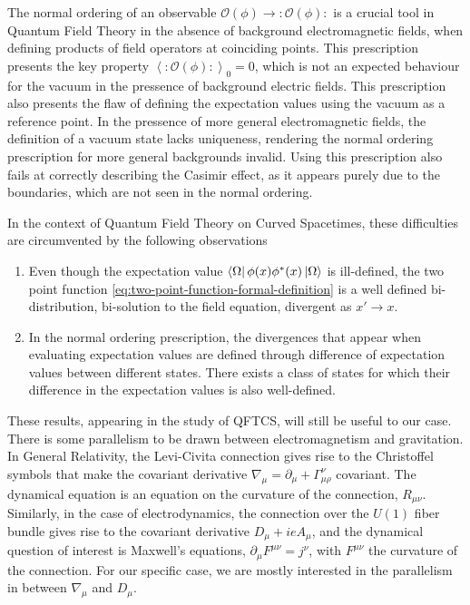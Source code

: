 The normal ordering of an observable $\mathcal{O}(\phi) \rightarrow :\mathcal{O}(\phi):$ is a crucial tool in Quantum Field Theory in the absence of background electromagnetic fields, when defining products of field operators at coinciding points. This prescription presents the key property $ \left< :\mathcal{O}(\phi): \right>_0 = 0$, which is not an expected behaviour for the vacuum in the pressence of background electric fields. This prescription also presents the flaw of defining the expectation values using the vacuum as a reference point. In the pressence of more general electromagnetic fields, the definition of a vacuum state lacks uniqueness, rendering the normal ordering prescription for more general backgrounds invalid. Using this prescription also fails at correctly describing the Casimir effect, as it appears purely due to the boundaries, which are not seen in the normal ordering.

In the context of Quantum Field Theory on Curved Spacetimes, these difficulties are circumvented by the following observations
\begin{enumerate}
	\item Even though the expectation value $ \bra{\Omega} \phi(x)\phi^*(x) \ket{\Omega} $ is ill-defined, the two point function \eqref{eq:two-point-function-formal-definition} 
	is a well defined bi-distribution, bi-solution to the field equation, divergent as $x' \to x$.
	\item In the normal ordering prescription, the divergences that appear when evaluating expectation values are defined through difference of expectation values between different states. There exists a class of states for which their difference in the expectation values is also well-defined.
\end{enumerate}

These results, appearing in the study of QFTCS, will still be useful to our case. There is some parallelism to be drawn between electromagnetism and gravitation. In General Relativity, the Levi-Civita connection gives rise to the Christoffel symbols that make the covariant derivative $\nabla_\mu = \partial_\mu + \Gamma^\nu_{\mu\rho}$ covariant. The dynamical equation is an equation on the curvature of the connection, $R_{\mu\nu}$. Similarly, in the case of electrodynamics, the connection over the $U(1)$ fiber bundle gives rise to the covariant derivative $D_\mu + ie A_\mu $, and the dynamical question of interest is Maxwell's equations, $\partial_\mu F^{\mu\nu}=j^{\nu}$, with $F^{\mu\nu}$ the curvature of the connection. For our specific case, we are mostly interested in the parallelism in between $\nabla_\mu$ and $D_\mu$.

